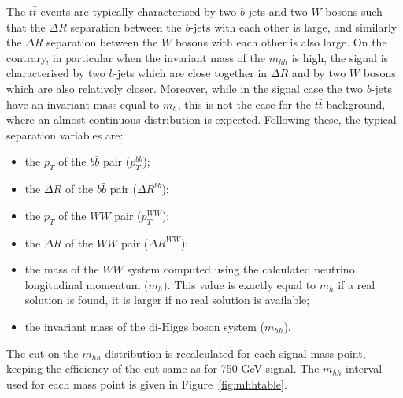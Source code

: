 The $t \bar{t}$ events are typically characterised by two $b$-jets and
two $W$ bosons such that the $\Delta R$ separation between the $b$-jets
with each other is large, and similarly the $\Delta R$ separation between
the $W$ bosons with each other is also large. On the contrary, in particular
when the invariant mass of the $m_{hh}$ is high, the signal is characterised
by two $b$-jets which are close together in $\Delta R$ and by two $W$ bosons
which are also relatively closer. Moreover, while in the signal 
case the two $b$-jets have an invariant mass equal to $m_h$, this is not
the case for the $t \bar{t}$ background, where an almost continuous
distribution is expected.  Following these, the typical separation variables are: 
\begin{itemize}
\item the $p_T$ of the $b \bar{b}$ pair ($p_T^{bb}$);
\item the $\Delta R$ of the $b \bar{b}$ pair ($\Delta R^{bb}$);
\item the $p_T$ of the $WW$ pair ($p_T^{WW}$);
\item the $\Delta R$ of the $WW$ pair ($\Delta R^{WW}$);
\item the mass of the $WW$ system computed using the calculated neutrino
      longitudinal momentum ($m_{h}$). This value is exactly equal to $m_h$
      if a real solution is found,
      it is larger if no real solution is available;
\item the invariant mass of the di-Higgs boson system ($m_{hh}$). 
\end{itemize}

The cut on the $m_{hh}$ distribution is recalculated for each signal mass point,
keeping the efficiency of the cut same as for 750 GeV signal. The
$m_{hh}$ interval used for  each mass point is given in Figure~\ref{fig:mhhtable}. 


